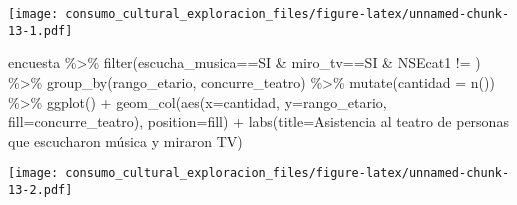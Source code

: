 \documentclass[
]{article}
\newenvironment{Shaded}{\begin{snugshade}}{\end{snugshade}}
\newcommand{\AttributeTok}[1]{\textcolor[rgb]{0.77,0.63,0.00}{#1}}
\newcommand{\FunctionTok}[1]{\textcolor[rgb]{0.00,0.00,0.00}{#1}}
\newcommand{\NormalTok}[1]{#1}
\newcommand{\SpecialCharTok}[1]{\textcolor[rgb]{0.00,0.00,0.00}{#1}}
\newcommand{\StringTok}[1]{\textcolor[rgb]{0.31,0.60,0.02}{#1}}
\begin{document}
\texttt{[image: consumo\_cultural\_exploracion\_files/figure-latex/unnamed-chunk-13-1.pdf]}

\begin{Shaded}
\begin{Highlighting}[]
\NormalTok{encuesta }\SpecialCharTok{\%\textgreater{}\%} 
  \FunctionTok{filter}\NormalTok{(escucha\_musica}\SpecialCharTok{==}\StringTok{\textquotesingle{}SI\textquotesingle{}} \SpecialCharTok{\&}\NormalTok{ miro\_tv}\SpecialCharTok{==}\StringTok{\textquotesingle{}SI\textquotesingle{}} \SpecialCharTok{\&}\NormalTok{ NSEcat1 }\SpecialCharTok{!=} \StringTok{\textquotesingle{}\textquotesingle{}}\NormalTok{) }\SpecialCharTok{\%\textgreater{}\%} 
  \FunctionTok{group\_by}\NormalTok{(rango\_etario, concurre\_teatro) }\SpecialCharTok{\%\textgreater{}\%} 
  \FunctionTok{mutate}\NormalTok{(}\AttributeTok{cantidad =} \FunctionTok{n}\NormalTok{()) }\SpecialCharTok{\%\textgreater{}\%} 
  \FunctionTok{ggplot}\NormalTok{() }\SpecialCharTok{+}
  \FunctionTok{geom\_col}\NormalTok{(}\FunctionTok{aes}\NormalTok{(}\AttributeTok{x=}\NormalTok{cantidad, }\AttributeTok{y=}\NormalTok{rango\_etario, }\AttributeTok{fill=}\NormalTok{concurre\_teatro), }\AttributeTok{position=}\StringTok{\textquotesingle{}fill\textquotesingle{}}\NormalTok{) }\SpecialCharTok{+}
  \FunctionTok{labs}\NormalTok{(}\AttributeTok{title=}\StringTok{\textquotesingle{}Asistencia al teatro de personas que escucharon música y miraron TV\textquotesingle{}}\NormalTok{)}
\end{Highlighting}
\end{Shaded}

\texttt{[image: consumo\_cultural\_exploracion\_files/figure-latex/unnamed-chunk-13-2.pdf]}
\end{document}
